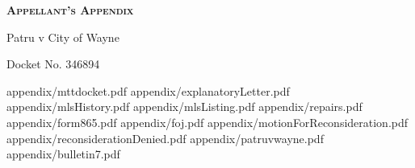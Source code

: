 \documentclass[12pt,\documentclassflag]{article}
\begin{document}

\begin{centering}
  \bf\scshape Appellant's Appendix\par%
  \rm Patru v City of Wayne\par%
  Docket No. 346894\par%
\end{centering}

\tableofcontents
\newpage
\renewcommand{\footrulewidth}{0.4pt}
\renewcommand{\subsectionmark}[1]{\markright{/#1}} %

\newcommand{\addLabelsToAllIncludedPages}[1]{%
   \refstepcounter{includepdfpage}%
   \stepcounter{currentpagecounter}%
   \label{#1.\thecurrentpagecounter}}%

\newcommand{\myincludepdf}[2]{%
  \setcounter{currentpagecounter}{0}%
  {appendix/#1.pdf}}%
  
\renewcommand{\sectionmark}[1]{\markboth{#1}{}} %
\myincludepdf{mttdocket}{1,section, 1, Tax Tribunal Docket}
\renewcommand{\sectionmark}[1]{\markboth{#1}{/Explanatory Letter}} %
\myincludepdf{explanatoryLetter}{1,section,1,Submitted Evidence,evidence,1,subsection,2,Explanatory Letter}%
\myincludepdf{mlsHistory}{1,subsection,2,MLS History}%
\myincludepdf{mlsListing}{1,subsection,2,MLS Listing Sheet}%
\myincludepdf{repairs}{1,subsection,2,List of Repairs}%
\myincludepdf{form865}{1,subsection,2,Form 865 Mathieu Gast Nonconsideration}%
\renewcommand{\sectionmark}[1]{\markboth{#1}{}} %
\myincludepdf{foj}{1,section,1,Final Opinion and Judgement}%
\myincludepdf{motionForReconsideration}{1,section,1,Motion For Reconsideration}%
\myincludepdf{reconsiderationDenied}{1,section,1,Reconsideration Denied} %
\myincludepdf{patruvwayne}{1,section,1,Patru v Wayne}
\myincludepdf{bulletin7}{1,section,1,STC Bulletin 7 of 2014 (Mathieu Gast Act)}%

\newpage\empty%
\end{document}
